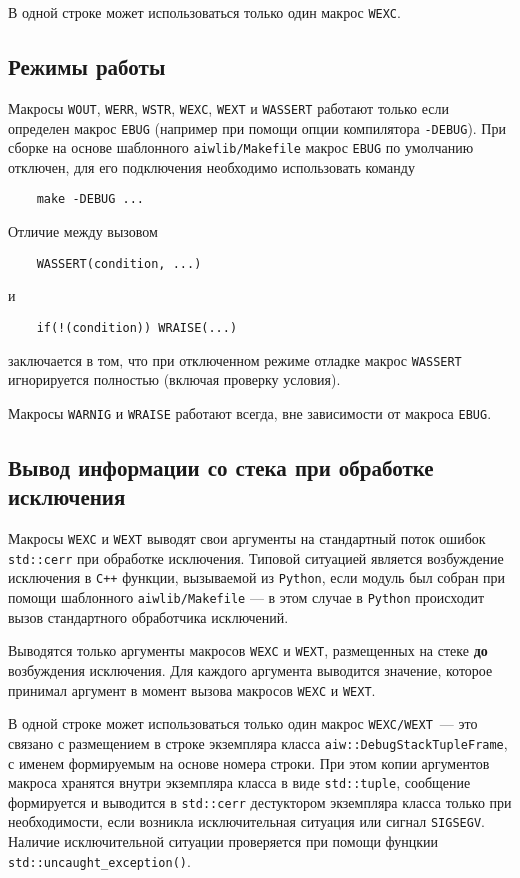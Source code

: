 В одной строке может использоваться только один макрос \verb'WEXC'.

\subsection{Режимы работы}
Макросы \verb'WOUT', \verb'WERR', \verb'WSTR', \verb'WEXC', \verb'WEXT' и \verb'WASSERT' работают только если определен макрос \verb'EBUG'
(например при помощи опции компилятора \verb'-DEBUG'). При сборке на основе шаблонного \verb'aiwlib/Makefile'
макрос \verb'EBUG' по умолчанию отключен, для его подключения необходимо использовать команду
\begin{verbatim}
    make -DEBUG ...
\end{verbatim}

Отличие между вызовом 
\begin{verbatim}
    WASSERT(condition, ...)
\end{verbatim}
и
\begin{verbatim}
    if(!(condition)) WRAISE(...)
\end{verbatim}
заключается в том, что при отключенном режиме отладке макрос \verb'WASSERT' игнорируется полностью (включая проверку условия).

Макросы \verb'WARNIG' и \verb'WRAISE' работают всегда, вне зависимости от макроса \verb'EBUG'.

\subsection{Вывод информации со стека при обработке исключения}
Макросы \verb'WEXC' и \verb'WEXT' выводят свои аргументы на стандартный поток ошибок \verb'std::cerr' при обработке исключения.
Типовой ситуацией является возбуждение исключения в \verb'C++' функции, вызываемой из \verb'Python', если
модуль был собран при помощи шаблонного \verb'aiwlib/Makefile' --- в этом случае в \verb'Python' происходит
вызов стандартного обработчика исключений.

Выводятся только аргументы макросов \verb'WEXC' и \verb'WEXT', размещенных на стеке {\bf до} возбуждения исключения.
Для каждого аргумента выводится значение, которое принимал аргумент в момент вызова макросов \verb'WEXC' и \verb'WEXT'.

В одной строке может использоваться только один макрос \verb'WEXC/WEXT'~--- это связано с размещением в строке
экземпляра класса \verb'aiw::DebugStackTupleFrame', с именем формируемым на основе номера строки.
При этом копии аргументов макроса хранятся внутри экземпляра класса в виде \verb'std::tuple', сообщение формируется и выводится в \verb'std::cerr'
дестуктором экземпляра класса только при необходимости, если возникла исключительная ситуация или сигнал \verb'SIGSEGV'.
Наличие исключительной ситуации проверяется при помощи фунцкии \verb'std::uncaught_exception()'.

